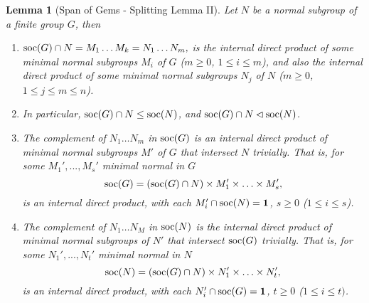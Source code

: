 \documentclass[a4paper,11pt]{amsart}
\newtheorem{lemma}[theorem]{Lemma}
\theoremstyle{definition}
\newcommand{\soc}{\mbox{\rm soc}}
\newcommand{\1}{{\mathbf 1}}
\begin{document}
\begin{lemma}[Span of Gems - Splitting Lemma II]  \label{SpanOfGems2}
Let $N$ be a normal subgroup of a finite group $G$, then
\begin{enumerate}
\item $\soc(G) \cap N =M_1 \ldots  M_k = N_1 \ldots N_m,$
is the internal direct product of some minimal normal subgroups $M_i$ of $G$ ($m\geq 0$, $1 \leq i \leq m$),  
and also the internal direct product of some minimal normal subgroups $N_j$ of $N$ ($m \geq 0$, $1 \leq j \leq m \leq n$). 
\item In particular, $\soc(G) \cap N \leq \soc(N)$, and $\soc(G)\cap N \lhd \soc(N)$. 
\item The complement of $N_1\ldots N_m$ in $\soc(G)$ is an internal direct product of minimal normal subgroups $M'$ of $G$ that intersect $N$ trivially. That is, for some  $M_1', ..., M_s'$ minimal normal in $G$ 
  $$\soc(G) = (\soc(G) \cap N) \times M_1' \times  \ldots \times  M'_s,$$ is an internal direct product,
  with each $M_i'\cap \soc(N)=\1$, $s\geq 0$ ($1\leq i \leq s$).
\item The complement of $N_1 \ldots N_M$ in $\soc(N)$  is the internal direct product of minimal normal subgroups of $N'$ that intersect $\soc(G)$ trivially. That is, for some $N_1', ..., N_t'$ minimal normal in $N$ 
$$\soc(N) = (\soc(G) \cap N) \times N_1' \times \ldots \times  N'_t,$$ 
is an internal direct product, with each $N_i'\cap \soc(G)=\1$,  $t\geq 0$ ($1\leq i \leq t)$. 
\end{enumerate}
\end{lemma}
\end{document}
